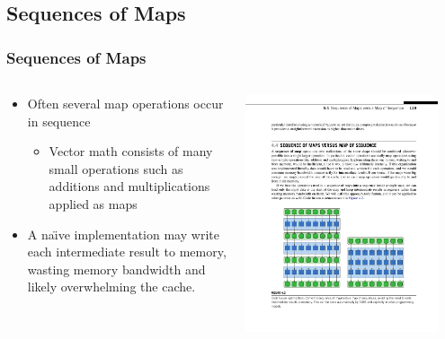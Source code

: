 \documentclass[xcolor=dvipsnames]{beamer}
\begin{document}
	
	\subsection{Sequences of Maps}
	
		\begin{frame} \frametitle{Sequences of Maps}
      \begin{columns}
        \begin{column}{0.48\textwidth}
          \begin{itemize}
            \item
              Often several map operations occur in sequence
              \begin{itemize}
                \item
                  Vector math consists of many small operations such as
                  additions and multiplications applied as maps
              \end{itemize}
            \item
              A na\"\i ve implementation may write each intermediate result to
              memory, wasting memory bandwidth and likely overwhelming the
              cache.
          \end{itemize}
        \end{column}
        \begin{column}{0.48\textwidth}
          \centering
          \includegraphics[width=0.9\textwidth]{images/figure-4-2-1}
        \end{column}
      \end{columns}
		\end{frame}
\end{document}
